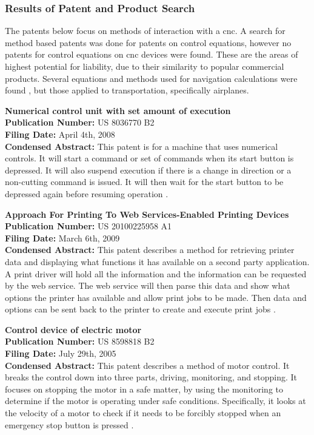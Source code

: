 \subsubsection{Results of Patent and Product Search}
The patents below focus on methods of interaction with a \gls{cnc}.
A search for method based patents was done for patents on control equations, however no patents for control equations on \gls{cnc} devices were found.
These are the areas of highest potential for liability, due to their similarity to popular commercial products.
Several equations and methods used for navigation calculations were found \cite{navpatent}, but those applied to transportation, specifically airplanes.

\textbf{Numerical control unit with set amount of execution} \\
\textbf{Publication Number:} US 8036770 B2 \\
\textbf{Filing Date:} April 4th, 2008 \\
\textbf{Condensed Abstract:}
This patent is for a machine that uses numerical controls.
It will start a command or set of commands when its start button is depressed.
It will also suspend execution if there is a change in direction or a non-cutting command is issued.
It will then wait for the start button to be depressed again before resuming operation \cite{executionpatent}.

\textbf{Approach For Printing To Web Services-Enabled Printing Devices} \\
\textbf{Publication Number:} US 20100225958 A1 \\
\textbf{Filing Date:} March 6th, 2009 \\
\textbf{Condensed Abstract:}
This patent describes a method for retrieving printer data and displaying what functions it has available on a second party application.
A print driver will hold all the information and the information can be requested by the web service.
The web service will then parse this data and show what options the printer has available and allow print jobs to be made.
Then data and options can be sent back to the printer to create and execute print jobs \cite{webservicepatent}.

\textbf{Control device of electric motor} \\
\textbf{Publication Number:} US 8598818 B2 \\
\textbf{Filing Date:} July 29th, 2005 \\
\textbf{Condensed Abstract:}
This patent describes a method of motor control. 
It breaks the control down into three parts, driving, monitoring, and stopping.
It focuses on stopping the motor in a safe matter, by using the monitoring to determine if the motor is operating under safe conditions.
Specifically, it looks at the velocity of a motor to check if it needs to be forcibly stopped when an emergency stop button is pressed \cite{motorcontrolpatent}.

